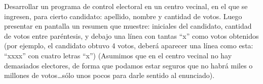 Desarrollar un programa de control electoral en un centro vecinal, en el que se ingresen, para cierto candidato: apellido, nombre y cantidad de votos. Luego presentar en pantalla un resumen que muestre: iniciales del candidato, cantidad de votos entre paréntesis, y debajo una línea con tantas ``x'' como votos obtenidos (por ejemplo, el candidato obtuvo 4 votos, deberá aparecer una línea como esta:  ``xxxx''  con cuatro letras ``x'') (Asumimos que en el centro vecinal no hay demasiados electores, de forma que podamos estar seguros que no habrá miles o millones de votos\ldots sólo unos pocos para darle sentido al enunciado).